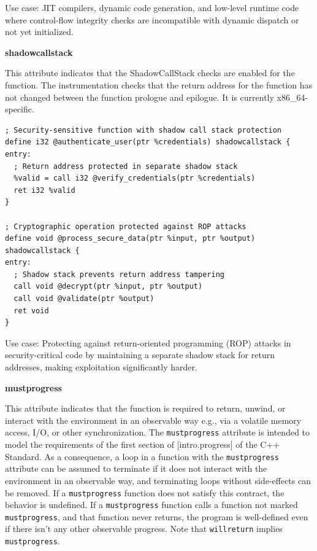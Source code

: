 Use case: JIT compilers, dynamic code generation, and low-level runtime code where control-flow integrity checks are incompatible with dynamic dispatch or not yet initialized.

\textbf{shadowcallstack}

This attribute indicates that the ShadowCallStack checks are enabled for the function.
The instrumentation checks that the return address for the function has not changed between the function prologue and epilogue.
It is currently x86\_64-specific.

\begin{lstlisting}[style=ir]
; Security-sensitive function with shadow call stack protection
define i32 @authenticate_user(ptr %credentials) shadowcallstack {
entry:
  ; Return address protected in separate shadow stack
  %valid = call i32 @verify_credentials(ptr %credentials)
  ret i32 %valid
}

; Cryptographic operation protected against ROP attacks
define void @process_secure_data(ptr %input, ptr %output) shadowcallstack {
entry:
  ; Shadow stack prevents return address tampering
  call void @decrypt(ptr %input, ptr %output)
  call void @validate(ptr %output)
  ret void
}
\end{lstlisting}

Use case: Protecting against return-oriented programming (ROP) attacks in security-critical code by maintaining a separate shadow stack for return addresses, making exploitation significantly harder.

\textbf{mustprogress}

This attribute indicates that the function is required to return, unwind, or interact with the environment in an observable way e.g., via a volatile memory access, I/O, or other synchronization.
The \texttt{mustprogress} attribute is intended to model the requirements of the first section of [intro.progress] of the C++ Standard.
As a consequence, a loop in a function with the \texttt{mustprogress} attribute can be assumed to terminate if it does not interact with the environment in an observable way, and terminating loops without side-effects can be removed.
If a \texttt{mustprogress} function does not satisfy this contract, the behavior is undefined.
If a \texttt{mustprogress} function calls a function not marked \texttt{mustprogress}, and that function never returns, the program is well-defined even if there isn't any other observable progress.
Note that \texttt{willreturn} implies \texttt{mustprogress}.

